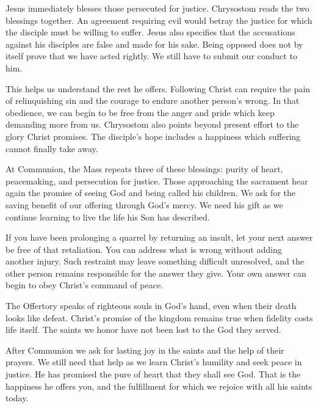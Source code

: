 Jesus immediately blesses those persecuted for justice.
Chrysostom reads the two blessings together. An agreement
requiring evil would betray the justice for which the disciple
must be willing to suffer. Jesus also specifies that the
accusations against his disciples are false and made for his
sake. Being opposed does not by itself prove that we have
acted rightly. We still have to submit our conduct to him.

This helps us understand the rest he offers. Following Christ
can require the pain of relinquishing sin and the courage to
endure another person's wrong. In that obedience, we can begin
to be free from the anger and pride which keep demanding more
from us. Chrysostom also points beyond present effort to the
glory Christ promises. The disciple's hope includes a happiness
which suffering cannot finally take away.

At Communion, the Mass repeats three of these blessings:
purity of heart, peacemaking, and persecution for justice.
Those approaching the sacrament hear again the promise of
seeing God and being called his children. We ask for the
saving benefit of our offering through God's mercy. We need
his gift as we continue learning to live the life his Son
has described.

If you have been prolonging a quarrel by returning an insult,
let your next answer be free of that retaliation. You can
address what is wrong without adding another injury. Such
restraint may leave something difficult unresolved, and the
other person remains responsible for the answer they give.
Your own answer can begin to obey Christ's command of peace.

The Offertory speaks of righteous souls in God's
hand, even when their death looks like defeat. Christ's
promise of the kingdom remains true when fidelity costs
life itself. The saints we honor have not been lost to the
God they served.

After Communion we ask for lasting joy in the saints and
the help of their prayers. We still need that help as we
learn Christ's humility and seek peace in justice. He has
promised the pure of heart that they shall see God. That
is the happiness he offers you, and the fulfillment for
which we rejoice with all his saints today.
